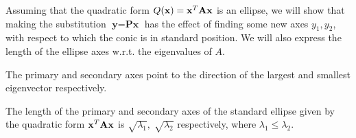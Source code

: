 \documentclass[a4paper]{article}
\numberwithin{equation}{section} %
\newcommand{\B}[1]{\textbf{\textup{#1}}} %
\begin{document}
Assuming that the quadratic form $Q(\B{x})=\B{x}^{T}\B{Ax}$ is an ellipse, we will show that making the substitution $\textbf{y}=\textbf{Px}$ has the effect of finding some new axes $y_{1}, y_{2}$, with respect to which the conic is in standard position. We will also express the length of the ellipse axes w.r.t. the eigenvalues of $A$.
\begin{corollary}
The primary and secondary axes point to the direction of the largest and smallest eigenvector respectively.
\end{corollary}
\begin{corollary}
The length of the primary and secondary axes of the standard ellipse given by the quadratic form $\B{x}^{T}\B{Ax}$ is $\sqrt{\lambda_{1}},\;\sqrt{\lambda_{2}}$ respectively, where $\lambda_{1}\leq\lambda_{2}$.
\end{corollary}
\end{document}
